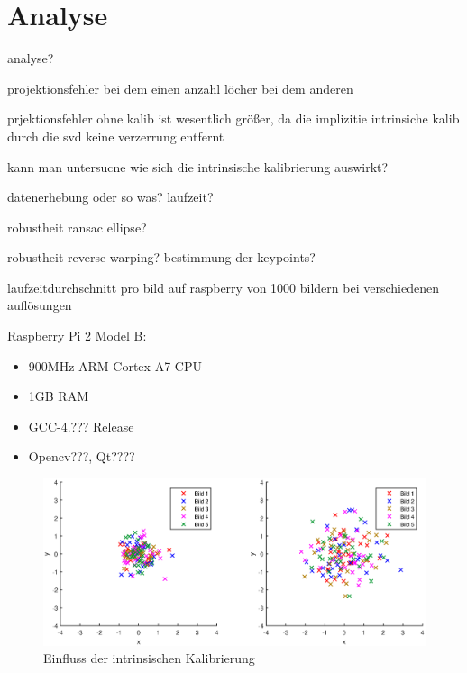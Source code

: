 \chapter{Analyse}
analyse?

projektionsfehler bei dem einen
anzahl löcher bei dem anderen

prjektionsfehler ohne kalib ist wesentlich größer, da die implizitie intrinsiche kalib durch die svd keine verzerrung entfernt

kann man untersucne wie sich die intrinsische kalibrierung auswirkt?

datenerhebung oder so was? laufzeit?

robustheit ransac ellipse?

robustheit reverse warping? bestimmung der keypoints?

laufzeitdurchschnitt pro bild  auf raspberry von 1000 bildern bei verschiedenen auflösungen

Raspberry Pi 2 Model B:
\begin{itemize}
	\item 900MHz ARM Cortex-A7 CPU
	\item 1GB RAM
	\item GCC-4.??? Release
	\item Opencv???, Qt????
\end{itemize}


\begin{figure}[!htb]
	\centering
	\includegraphics[width=\textwidth]{images/reprojectionErrorReverse.eps}
	\caption{Einfluss der intrinsischen Kalibrierung}
	\label{fig:influenceCalib}
\end{figure}



